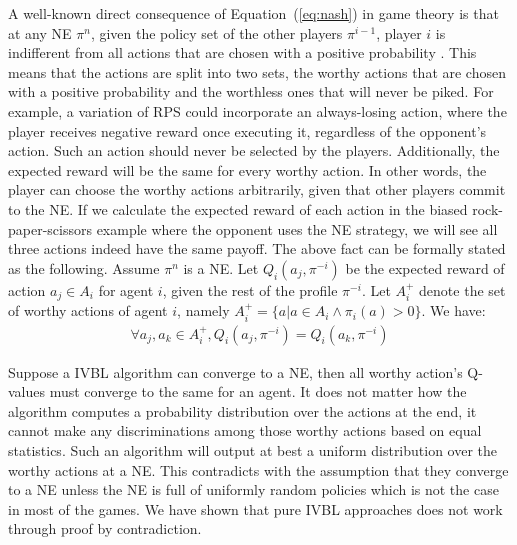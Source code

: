\documentclass[]{interact}
\theoremstyle{plain}%
\theoremstyle{definition}
\theoremstyle{remark}
\begin{document}
A well-known direct consequence of Equation~(\ref{eq:nash}) in game theory is that at any NE $\pi^n$, given the policy set of the other players $\pi^{i-1}$, player $i$ is indifferent from all actions that are chosen with a positive probability \cite{nash2024non}. This means that the actions are split into two sets, the worthy actions that are chosen with a positive probability and the worthless ones that will never be piked. For example, a variation of RPS could incorporate an always-losing action, where the player receives negative reward once executing it, regardless of the opponent’s action. Such an action should never be selected by the players. Additionally, the expected reward will be the same for every worthy action. In other words, the player can choose the worthy actions arbitrarily, given that other players commit to the NE. If we calculate the expected reward of each action in the biased rock-paper-scissors example where the opponent uses the NE strategy, we will see all three actions indeed have the same payoff. The above fact can be formally stated as the following. Assume $\pi^n$ is a NE. Let $Q_i(a_j, \pi^{-i})$ be the expected reward of action $a_j \in A_i$ for agent $i$, given the rest of the profile $\pi^{-i}$. Let $A^+_i$ denote the set of worthy actions of agent $i$, namely $A^+_i = \{a | a \in A_i \wedge \pi_i(a) > 0 \}$. We have:
\begin{equation}
    \begin{aligned}
    \forall a_j, a_k \in A^+_i, Q_i(a_j, \pi^{-i}) = Q_i(a_k, \pi^{-i})
    \label{eq:nash_indifferent}
    \end{aligned}
\end{equation}

Suppose a IVBL algorithm can converge to a NE, then all worthy action's Q-values must converge to the same for an agent. It does not matter how the algorithm computes a probability distribution over the actions at the end, it cannot make any discriminations among those worthy actions based on equal statistics. Such an algorithm will output at best a uniform distribution over the worthy actions at a NE. This contradicts with the assumption that they converge to a NE unless the NE is full of uniformly random policies which is not the case in most of the games. We have shown that pure IVBL approaches does not work through proof by contradiction.
\end{document}
